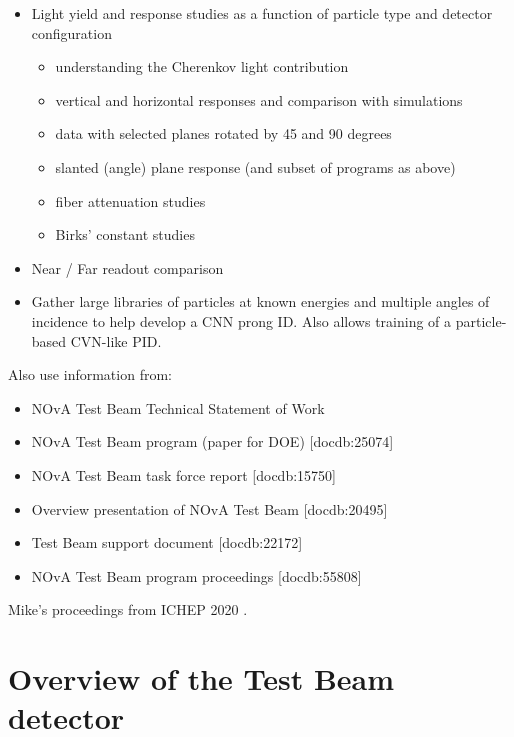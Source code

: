 \documentclass[12pt,a4paper]{article}
\begin{document}
\begin{itemize}
\item Light yield and response studies as a function of particle type and detector configuration
\begin{itemize}
\item understanding the Cherenkov light contribution
\item vertical and horizontal responses and comparison with simulations
\item data with selected planes rotated by 45 and 90 degrees
\item slanted (angle) plane response (and subset of programs as above)
\item fiber attenuation studies
\item Birks’ constant studies
\end{itemize}
\item Near / Far readout comparison
\item Gather large libraries of particles at known energies and multiple angles of incidence to help develop a CNN prong ID. Also allows training of a particle-based CVN-like PID.
\end{itemize}

Also use information from:
\begin{itemize}
\item NOvA Test Beam Technical Statement of Work
\item NOvA Test Beam program (paper for DOE) [docdb:25074]
\item NOvA Test Beam task force report [docdb:15750]
\item Overview presentation of NOvA Test Beam [docdb:20495]
\item Test Beam support document [docdb:22172]
\item NOvA Test Beam program proceedings [docdb:55808]
\end{itemize}

Mike's proceedings from ICHEP 2020 \cite{WallbankProceedingsICHEP2020}.

\section{Overview of the Test Beam detector}
\end{document}
